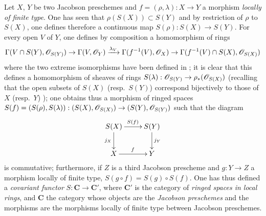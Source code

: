 \begin{env}[10.9.2]
\label{IV.10.9.2}
Let $X$, $Y$ be two Jacobson preschemes and $f=(\rho,\lambda):X\to Y$ a morphism \emph{locally of finite type}.
One has seen  that $\rho(S(X))\subset S(Y)$ and by restriction of $\rho$ to $S(X)$, one defines therefore a continuous map $S(\rho):S(X)\to S(Y)$.
For every open $V$ of $Y$, one defines by composition a homomorphism of rings
\[
  \Gamma(V\cap S(Y),\mathscr{O}_{S(Y)})\to\Gamma(V,\mathscr{O}_Y)\xrightarrow{\lambda_V}\Gamma(f^{-1}(V),\mathscr{O}_X)\to\Gamma(f^{-1}(V)\cap S(X),\mathscr{O}_{S(X)})
\]
where the two extreme isomorphisms have been defined in ; it is clear that this defines a homomorphism of sheaves of rings $S(\lambda):\mathscr{O}_{S(Y)}\to\rho_*(\mathscr{O}_{S(X)})$ (recalling that the open subsets of $S(X)$ (resp.\ $S(Y)$) correspond bijectively to those of $X$ (resp.\ $Y$) ); one obtains thus a morphism of ringed spaces $S(f)=(S(\rho),S(\lambda)):(S(X),\mathscr{O}_{S(X)})\to(S(Y),\mathscr{O}_{S(Y)})$ such that the diagram
\[
  \xymatrix{
    S(X)\ar[r]^{S(f)}\ar[d]_{j_X} & S(Y)\ar[d]^{j_Y}\\
    X\ar[r]^{f} & Y
  }
\]
is commutative; furthermore, if $Z$ is a third Jacobson prescheme and $g:Y\to Z$ a morphism locally of finite type, $S(g\circ f)=S(g)\circ S(f)$.
One has thus defined a \emph{covariant functor} $S:\mathbf{C}\to\mathbf{C}'$, where $\mathbf{C}'$ is the category of \emph{ringed spaces in local rings}, and $\mathbf{C}$ the category whose objects are the \emph{Jacobson preschemes} and the morphisms are the morphisms locally of finite type between Jacobson preschemes.
\end{env}

